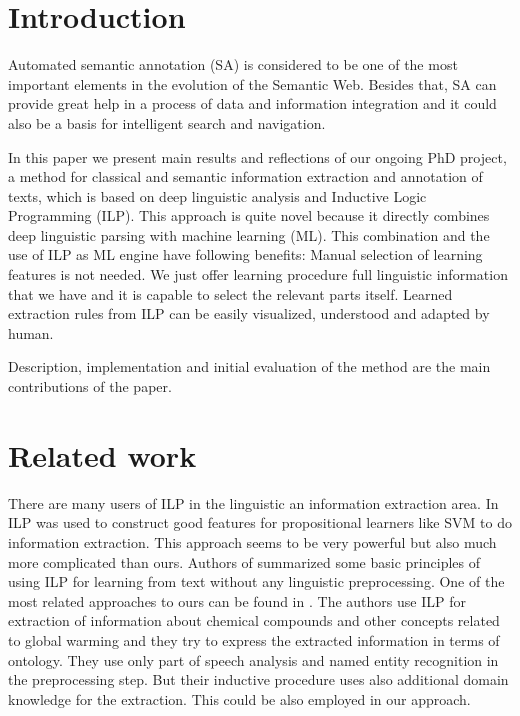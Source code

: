 \documentclass[runningheads,a4paper]{llncs}
\begin{document}
\section{Introduction}
Automated semantic annotation (SA) is considered to be one of the most important elements in the evolution of the Semantic Web. Besides that, SA can provide great help in a process of data and information integration and it could also be a basis for intelligent search and navigation.

In this paper we present main results and reflections of our ongoing PhD project, a method for classical and semantic information extraction and annotation of texts, which is based on deep linguistic analysis and Inductive Logic Programming (ILP). This approach is quite novel because it directly combines deep linguistic parsing with machine learning (ML). This combination and the use of ILP as ML engine have following benefits: Manual selection of learning features is not needed. We just offer learning procedure full linguistic information that we have and it is capable to select the relevant parts itself. Learned extraction rules from ILP can be easily visualized, understood and adapted by human.

Description, implementation and initial evaluation of the method are the main contributions of the paper.




\section{Related work}
There are many users of ILP in the linguistic an information extraction area.
In \cite{Ramakrishnan:UsingILPforFeatures} ILP was used to construct good features for propositional learners like SVM to do information extraction. This approach seems to be very powerful but also much more complicated than ours. Authors of \cite{Junker99learningfor} summarized some basic principles of using ILP for learning from text without any linguistic preprocessing. One of the most related approaches to ours can be found in \cite{aitken02:_learn_infor_extrac_rules}. The authors use ILP for extraction of information about chemical compounds and other concepts related to global warming and they try to express the extracted information in terms of ontology. They use only part of speech analysis and named entity recognition in the preprocessing step. But their inductive procedure uses also additional domain knowledge for the extraction. This could be also employed in our approach.
\end{document}
